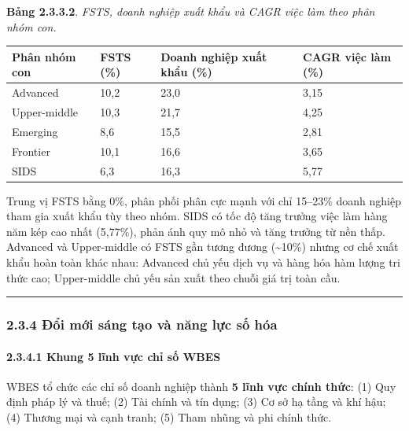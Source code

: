 \documentclass[12pt,a4paper]{article}
\begin{document}
\textbf{Bảng 2.3.3.2}. \emph{FSTS, doanh nghiệp xuất khẩu và CAGR việc
làm theo phân nhóm con.}

\begin{longtable}[]{@{}llll@{}}
\toprule\noalign{}
Phân nhóm con & FSTS (\%) & Doanh nghiệp xuất khẩu (\%) & CAGR việc làm
(\%) \\
\midrule\noalign{}
\endhead
\bottomrule\noalign{}
\endlastfoot
Advanced & 10,2 & 23,0 & 3,15 \\
Upper-middle & 10,3 & 21,7 & 4,25 \\
Emerging & 8,6 & 15,5 & 2,81 \\
Frontier & 10,1 & 16,6 & 3,65 \\
SIDS & 6,3 & 16,3 & 5,77 \\
\end{longtable}

Trung vị FSTS bằng 0\%, phân phối phân cực mạnh với chỉ 15--23\% doanh
nghiệp tham gia xuất khẩu tùy theo nhóm. SIDS có tốc độ tăng trưởng việc
làm hàng năm kép cao nhất (5,77\%), phản ánh quy mô nhỏ và tăng trưởng
từ nền thấp. Advanced và Upper-middle có FSTS gần tương đương
(\textasciitilde10\%) nhưng cơ chế xuất khẩu hoàn toàn khác nhau:
Advanced chủ yếu dịch vụ và hàng hóa hàm lượng tri thức cao;
Upper-middle chủ yếu sản xuất theo chuỗi giá trị toàn cầu.

\begin{center}\rule{0.5\linewidth}{0.5pt}\end{center}

\hypertarget{234-ux111ux1ed5i-mux1edbi-suxe1ng-tux1ea1o-vuxe0-nux103ng-lux1ef1c-sux1ed1-huxf3a}{%
\subsubsection{2.3.4 Đổi mới sáng tạo và năng lực số
hóa}\label{234-ux111ux1ed5i-mux1edbi-suxe1ng-tux1ea1o-vuxe0-nux103ng-lux1ef1c-sux1ed1-huxf3a}}

\hypertarget{2341-khung-5-lux129nh-vux1ef1c-chux1ec9-sux1ed1-wbes}{%
\paragraph{2.3.4.1 Khung 5 lĩnh vực chỉ số
WBES}\label{2341-khung-5-lux129nh-vux1ef1c-chux1ec9-sux1ed1-wbes}}

WBES tổ chức các chỉ số doanh nghiệp thành \textbf{5 lĩnh vực chính
thức}: (1) Quy định pháp lý và thuế; (2) Tài chính và tín dụng; (3) Cơ
sở hạ tầng và khí hậu; (4) Thương mại và cạnh tranh; (5) Tham nhũng và
phi chính thức.
\end{document}
